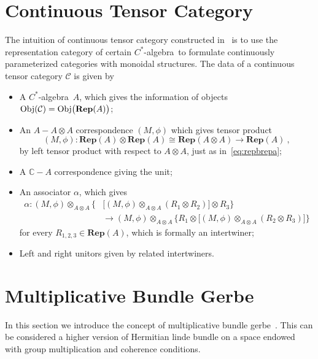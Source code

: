 \documentclass[a4paper,11pt]{article}
\newcommand{\Rep}{\textbf{Rep}}
\newcommand{\be}{\begin{equation}}
\newcommand{\ee}{\end{equation}}
\newcommand{\ba}{\begin{aligned}}
\newcommand{\ea}{\end{aligned}}
\def\bbC{\mathbb{C}}
\def\CC{\mathcal{C}}
\def\calg{$C^*$-algebra\ }
\begin{document}
\section{Continuous Tensor Category}\label{app:continuoustc}
The intuition of continuous tensor category constructed in~\cite{Marin-Salvador:2025stc} is to use the representation category of certain \calg to formulate continuously parameterized categories with monoidal structures. The data of a continuous tensor category $\CC$ is given by
\begin{itemize}
    \item A \calg $A$, which gives the information of objects ${\rm Obj}(\CC) = {\rm Obj}\big(\Rep(A)\big)$; 
    \item An $A-A\otimes A$ correspondence $(M,\phi)$ which gives tensor product
    \be
    (M,\phi) : \Rep(A) \otimes \Rep(A) \cong \Rep(A\otimes A) \to \Rep(A) \ ,
    \ee
    by left tensor product with respect to $A\otimes A$, just as in~\eqref{eq:repbrepa};
    \item A $\bbC-A$ correspondence giving the unit;
    \item An associator $\alpha$, which gives
    \be\ba
    \alpha: (M,\phi)\otimes_{A\otimes A}\Big\{ &\Big[ (M,\phi)\otimes_{A\otimes A}( R_1 \otimes R_2) \Big] \otimes R_3 \Big\} \\ &\to (M,\phi)\otimes_{A\otimes A} \Big\{R_1\otimes\Big[(M,\phi)\otimes_{A\otimes A}(R_2\otimes R_3)\Big]\Big\}
    \ea\ee
    for every $R_{1,2,3}\in \Rep(A)$, which is formally an intertwiner;
    \item Left and right unitors given by related intertwiners.
\end{itemize}

\section{Multiplicative Bundle Gerbe}\label{app:multbdgb}
In this section we introduce the concept of multiplicative bundle gerbe~\cite{Murray:1996bdg}. This can be considered a higher version of Hermitian linde bundle on a space endowed with group multiplication and coherence conditions.
\end{document}
